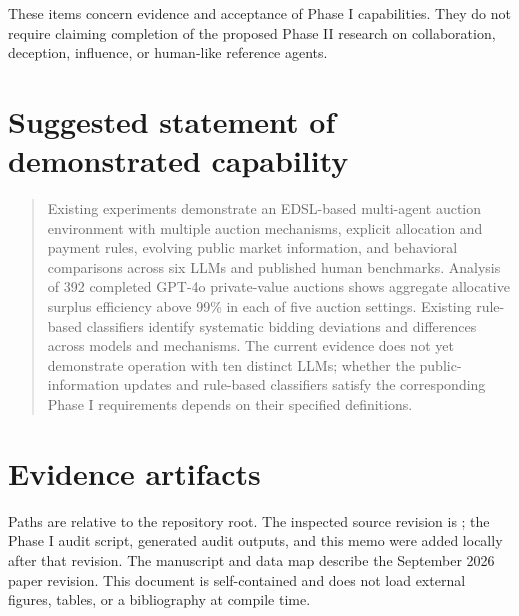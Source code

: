 \documentclass[11pt,letterpaper]{article}
\begin{document}
These items concern evidence and acceptance of Phase I capabilities. They
do not require claiming completion of the proposed Phase II research on
collaboration, deception, influence, or human-like reference agents.

\section{Suggested statement of demonstrated capability}

\begin{quote}
Existing experiments demonstrate an EDSL-based multi-agent auction
environment with multiple auction mechanisms, explicit allocation and
payment rules, evolving public market information, and behavioral
comparisons across six LLMs and published human benchmarks. Analysis of 392
completed GPT-4o private-value auctions shows aggregate allocative surplus
efficiency above 99\% in each of five auction settings. Existing rule-based
classifiers identify systematic bidding deviations and differences across
models and mechanisms. The current evidence does not yet demonstrate
operation with ten distinct LLMs; whether the public-information updates
and rule-based classifiers satisfy the corresponding Phase I requirements
depends on their specified definitions.
\end{quote}

\section{Evidence artifacts}
\label{sec:artifacts}

Paths are relative to the repository root. The inspected source revision is
; the Phase I audit script,
generated audit outputs, and this memo were added locally after that revision.
The manuscript and data map describe the September 2026 paper revision.
This document is self-contained and does not load external figures, tables,
or a bibliography at compile time.
\end{document}

